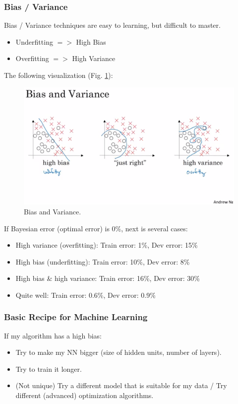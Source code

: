 \subsubsection{Bias / Variance}
Bias / Variance techniques are easy to learning, but difficult to master.

\begin{itemize}
    \item Underfitting $=>$ High Bias
    \item Overfitting $=>$ High Variance
\end{itemize}

The following visualization (Fig. \ref{bias-variance}):

\begin{figure}
    \centering
    \includegraphics[width=1.0\textwidth, trim={0 70, 0 60}, clip]{img/c2/bias-variance.png}
    \caption{Bias and Variance.}
    \label{bias-variance}
\end{figure}

If Bayesian error (optimal error) is 0\%, next is several cases:

\begin{itemize}
    \item High variance (overfitting): Train error: 1\%, Dev error: 15\%
    \item High bias (underfitting): Train error: 10\%, Dev error: 8\%
    \item High bias \& high variance: Train error: 16\%, Dev error: 30\%
    \item Quite well: Train error: 0.6\%, Dev error: 0.9\%
\end{itemize}

\subsubsection{Basic Recipe for Machine Learning}
If my algorithm has a high bias:
\begin{itemize}
    \item Try to make my NN bigger (size of hidden units, number of layers).
    \item Try to train it longer.
    \item (Not unique) Try a different model that is suitable for my data / Try different (advanced) optimization algorithms.
\end{itemize}


